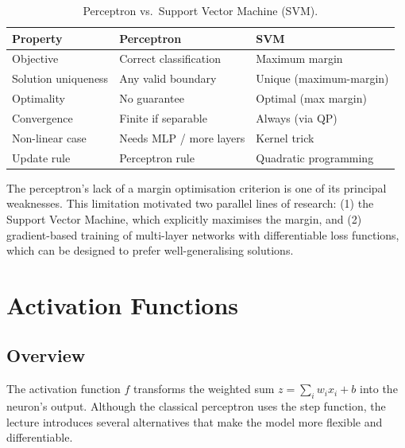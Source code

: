\documentclass[12pt,a4paper]{article}
\begin{document}
\begin{table}[ht]
\centering
\caption{Perceptron vs.\ Support Vector Machine (SVM).}
\label{tab:perceptron-svm}
\begin{tabular}{lll}
\toprule
\textbf{Property} & \textbf{Perceptron} & \textbf{SVM} \\
\midrule
Objective          & Correct classification & Maximum margin \\
Solution uniqueness & Any valid boundary     & Unique (maximum-margin) \\
Optimality         & No guarantee           & Optimal (max margin) \\
Convergence        & Finite if separable    & Always (via QP) \\
Non-linear case    & Needs MLP / more layers & Kernel trick \\
Update rule        & Perceptron rule        & Quadratic programming \\
\bottomrule
\end{tabular}
\end{table}

\begin{keyinsight}[title=Key Insight -- Perceptron Finds a Solution but Not the Best]
The perceptron's lack of a margin optimisation criterion is one of its
principal weaknesses.  This limitation motivated two parallel lines of
research: (1) the Support Vector Machine, which explicitly maximises the
margin, and (2) gradient-based training of multi-layer networks with
differentiable loss functions, which can be designed to prefer
well-generalising solutions.
\end{keyinsight}

\section{Activation Functions}
\label{sec:activations}

\subsection{Overview}
\label{subsec:activations-overview}

The activation function $f$ transforms the weighted sum $z =
\sum_i w_i x_i + b$ into the neuron's output.  Although the classical
perceptron uses the step function, the lecture introduces several
alternatives that make the model more flexible and differentiable.
\end{document}
